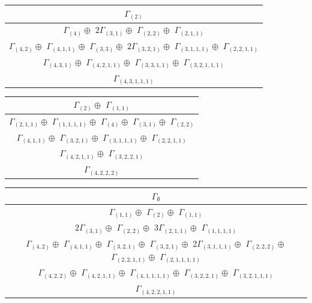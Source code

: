 \documentclass[main.tex]{subfiles}
\begin{document}
\bigskip
\begin{minipage}{.55\textwidth}
\centering
\begin{tabular}{c}
$\Gamma_{(
2
)}$
\\ \hline
$\Gamma_{(
4
)} \oplus$
$2\Gamma_{(
3 , 
1
)} \oplus$
$\Gamma_{(
2 , 
2
)} \oplus$
$\Gamma_{(
2 , 
1 , 
1
)}$
\\ \hline
$\Gamma_{(
4 , 
2
)} \oplus$
$\Gamma_{(
4 , 
1 , 
1
)} \oplus$
$\Gamma_{(
3 , 
3
)} \oplus$
$2\Gamma_{(
3 , 
2 , 
1
)} \oplus$
$\Gamma_{(
3 , 
1 , 
1 , 
1
)} \oplus$
$\Gamma_{(
2 , 
2 , 
1 , 
1
)}$
\\ \hline
$\Gamma_{(
4 , 
3 , 
1
)} \oplus$
$\Gamma_{(
4 , 
2 , 
1 , 
1
)} \oplus$
$\Gamma_{(
3 , 
3 , 
1 , 
1
)} \oplus$
$\Gamma_{(
3 , 
2 , 
1 , 
1 , 
1
)}$
\\ \hline
$\Gamma_{(
4 , 
3 , 
1 , 
1 , 
1
)}$
\\
\end{tabular}\end{minipage}
\begin{minipage}{.5\textwidth}
\centering
\begin{tabular}{c}
$\Gamma_{(
2
)} \oplus$
$\Gamma_{(
1 , 
1
)}$
\\ \hline
$\Gamma_{(
2 , 
1 , 
1
)} \oplus$
$\Gamma_{(
1 , 
1 , 
1 , 
1
)} \oplus$
$\Gamma_{(
4
)} \oplus$
$\Gamma_{(
3 , 
1
)} \oplus$
$\Gamma_{(
2 , 
2
)}$
\\ \hline
$\Gamma_{(
4 , 
1 , 
1
)} \oplus$
$\Gamma_{(
3 , 
2 , 
1
)} \oplus$
$\Gamma_{(
3 , 
1 , 
1 , 
1
)} \oplus$
$\Gamma_{(
2 , 
2 , 
1 , 
1
)}$
\\ \hline
$\Gamma_{(
4 , 
2 , 
1 , 
1
)} \oplus$
$\Gamma_{(
3 , 
2 , 
2 , 
1
)}$
\\ \hline
$\Gamma_{(
4 , 
2 , 
2 , 
2
)}$
\\
\end{tabular}\end{minipage}
\bigskip
\begin{minipage}{1\textwidth}
\centering
\begin{tabular}{c}
$\Gamma_\emptyset$
\\ \hline
$\Gamma_{(
1 , 
1
)} \oplus$
$\Gamma_{(
2
)} \oplus$
$\Gamma_{(
1 , 
1
)}$
\\ \hline
$2\Gamma_{(
3 , 
1
)} \oplus$
$\Gamma_{(
2 , 
2
)} \oplus$
$3\Gamma_{(
2 , 
1 , 
1
)} \oplus$
$\Gamma_{(
1 , 
1 , 
1 , 
1
)}$
\\ \hline
$\Gamma_{(
4 , 
2
)} \oplus$
$\Gamma_{(
4 , 
1 , 
1
)} \oplus$
$\Gamma_{(
3 , 
2 , 
1
)} \oplus$
$\Gamma_{(
3 , 
2 , 
1
)} \oplus$
$2\Gamma_{(
3 , 
1 , 
1 , 
1
)} \oplus$
$\Gamma_{(
2 , 
2 , 
2
)} \oplus$
$\Gamma_{(
2 , 
2 , 
1 , 
1
)} \oplus$
$\Gamma_{(
2 , 
1 , 
1 , 
1 , 
1
)}$
\\ \hline
$\Gamma_{(
4 , 
2 , 
2
)} \oplus$
$\Gamma_{(
4 , 
2 , 
1 , 
1
)} \oplus$
$\Gamma_{(
4 , 
1 , 
1 , 
1 , 
1
)} \oplus$
$\Gamma_{(
3 , 
2 , 
2 , 
1
)} \oplus$
$\Gamma_{(
3 , 
2 , 
1 , 
1 , 
1
)}$
\\ \hline
$\Gamma_{(
4 , 
2 , 
2 , 
1 , 
1
)}$
\\
\end{tabular}\end{minipage}
\end{document}
